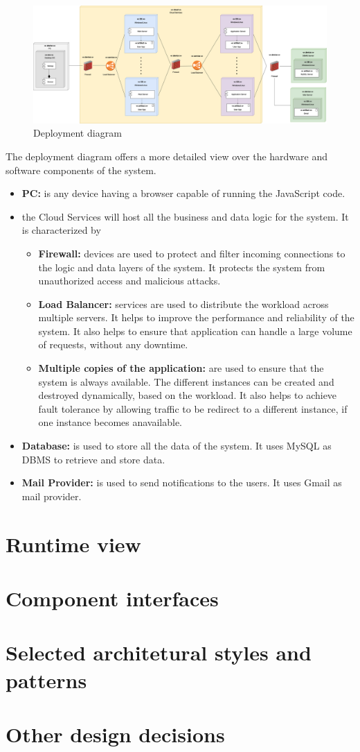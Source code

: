 \begin{figure}[H]
    \centering
    \includegraphics[width=1\textwidth]{images/Deployment_diagram.png}
    \caption{Deployment diagram}
\end{figure}

The deployment diagram offers a more detailed view over the hardware and software components of the system. 
\begin{itemize}
    \item  \textbf{PC: }is any device having a browser capable of running the JavaScript code.
    \item   the Cloud Services will host all the business and data logic for the system. It is characterized by 
    \begin{itemize}
        \item  \textbf{Firewall:} devices are used to protect and filter incoming connections to the logic and data layers of the system. It protects the system from unauthorized access and malicious attacks.
        \item  \textbf{Load Balancer:} services are used to distribute the workload across multiple servers. It helps to improve the performance and reliability of the system. It also helps to ensure that application can handle a large volume of requests, without any downtime.
        \item  \textbf{Multiple copies of the application:} are used to ensure that the system is always available. The different instances can be created and destroyed dynamically, based on the workload. It also helps to achieve fault tolerance by allowing traffic to be redirect to a different instance, if one instance becomes anavailable.
    \end{itemize}
    \item   \textbf{Database:} is used to store all the data of the system. It uses MySQL as DBMS to retrieve and store data.
    \item   \textbf{Mail Provider: }is used to send notifications to the users. It uses Gmail as mail provider.
\end{itemize}

\section{Runtime view}
\section{Component interfaces}
\section{Selected architetural styles and patterns}
\section{Other design decisions}